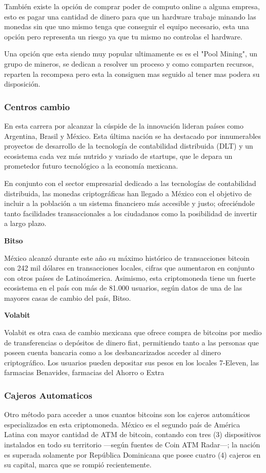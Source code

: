 \documentclass[12pt,letterpaper]{article}
\begin{document}
	Tambi\'en existe la opci\'on de comprar poder de computo online a alguna empresa, esto es pagar una cantidad de dinero para que un hardware trabaje minando las monedas sin que uno mismo tenga que conseguir el equipo necesario, esta una opci\'on pero representa un riesgo ya que tu mismo no controlas el hardware.
	
	Una opci\'on que esta siendo muy popular ultimamente es es el "Pool Mining", un grupo de mineros, se dedican a resolver un proceso y como comparten recursos, reparten la recompesa pero esta la consiguen mas seguido al tener mas podera su disposici\'on.
	
		\subsubsection*{Centros cambio}
En esta carrera por alcanzar la c\'uspide de la innovaci\'on lideran pa\'ises como Argentina, Brasil y M\'exico. Esta \'ultima naci\'on se ha destacado por innumerables proyectos de desarrollo de la tecnolog\'ia de contabilidad distribuida (DLT) y un ecosistema cada vez m\'as nutrido y variado de startups, que le depara un prometedor futuro tecnol\'ogico a la econom\'ia mexicana.		

En conjunto con el sector empresarial dedicado a las tecnolog\'ias de contabilidad distribuida, las monedas criptogr\'aficas han llegado a M\'exico con el objetivo de incluir a la poblaci\'on a un sistema financiero m\'as accesible y justo; ofreci\'endole tanto facilidades transaccionales a los ciudadanos como la posibilidad de invertir a largo plazo.

\textbf{Bitso}

M\'exico alcanz\'o durante este año su m\'aximo hist\'orico de transacciones bitcoin con 242 mil d\'olares en transacciones locales, cifras que aumentaron en conjunto con otros pa\'ises de Latino\'america. Asimismo, esta criptomoneda tiene un fuerte ecosistema en el pa\'is con m\'as de 81.000 usuarios, seg\'un datos de una de las mayores casas de cambio del pa\'is, Bitso.

\textbf{Volabit}

Volabit es otra casa de cambio mexicana que ofrece compra de bitcoins por medio de transferencias o dep\'ositos de dinero fiat, permitiendo tanto a las personas que poseen cuenta bancaria como a los desbancarizados acceder al dinero criptogr\'afico. Los usuarios pueden depositar sus pesos en los locales 7-Eleven, las farmacias Benavides, farmacias del Ahorro o Extra
\subsubsection*{Cajeros Automaticos}
Otro m\'etodo para acceder a unos cuantos bitcoins son los cajeros autom\'aticos especializados en esta criptomoneda. M\'exico es el segundo pa\'is de Am\'erica Latina con mayor cantidad de ATM de bitcoin, contando con tres (3) dispositivos instalados en todo su territorio —seg\'un fuentes de Coin ATM Radar—; la naci\'on es superada solamente por Rep\'ublica Dominicana que posee cuatro (4) cajeros en su capital, marca que se rompi\'o recientemente.
\end{document}
